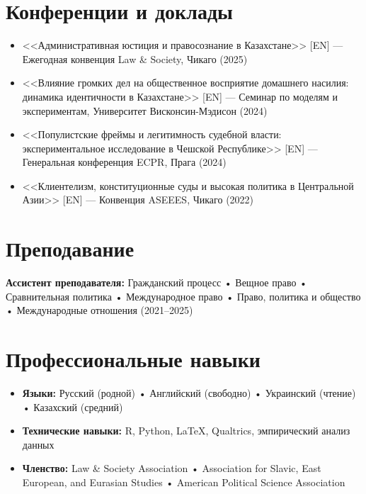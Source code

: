 \documentclass[10pt,a4paper]{article}
\begin{document}
\section{Конференции и доклады}

\begin{itemize}
    \item <<Административная юстиция и правосознание в Казахстане>> [EN] — Ежегодная конвенция Law \& Society, Чикаго (2025)
    \item <<Влияние громких дел на общественное восприятие домашнего насилия: динамика идентичности в Казахстане>> [EN] — Семинар по моделям и экспериментам, Университет Висконсин-Мэдисон (2024)
    \item <<Популистские фреймы и легитимность судебной власти: экспериментальное исследование в Чешской Республике>> [EN] — Генеральная конференция ECPR, Прага (2024)
    \item <<Клиентелизм, конституционные суды и высокая политика в Центральной Азии>> [EN] — Конвенция ASEEES, Чикаго (2022)
\end{itemize}

\section{Преподавание}

\textbf{Ассистент преподавателя:} Гражданский процесс • Вещное право • Сравнительная политика • Международное право • Право, политика и общество • Международные отношения (2021--2025)

\section{Профессиональные навыки}

\begin{itemize}
    \item[] \textbf{Языки:} Русский (родной) • Английский (свободно) • Украинский (чтение) • Казахский (средний)
    \item[] \textbf{Технические навыки:} R, Python, \LaTeX, Qualtrics, эмпирический анализ данных
    \item[] \textbf{Членство:} Law \& Society Association • Association for Slavic, East European, and Eurasian Studies • American Political Science Association
\end{itemize}
\end{document}
